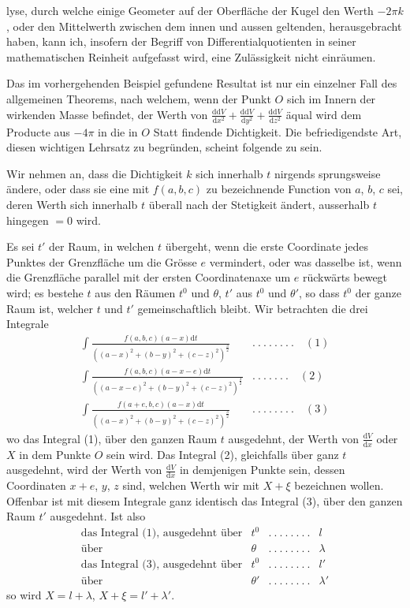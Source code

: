 lyse, durch welche einige Geometer auf der Oberfläche der Kugel den Werth $-2\pi k$, oder den Mittelwerth zwischen dem innen und aussen geltenden, herausgebracht haben, kann ich, insofern der Begriff von Differentialquotienten in seiner mathematischen Reinheit aufgefasst wird, eine Zulässigkeit nicht einräumen.

Das im vorhergehenden Beispiel gefundene Resultat ist nur ein einzelner Fall des allgemeinen Theorems, nach welchem, wenn der Punkt $O$ sich im Innern der wirkenden Masse befindet, der Werth von $\frac{\mathrm{d}\mathrm{d}V}{\mathrm{d}x^2}+\frac{\mathrm{d}\mathrm{d}V}{\mathrm{d}y^2}+\frac{\mathrm{d}\mathrm{d}V}{\mathrm{d}z^2}$ äqual wird dem Producte aus $-4\pi$ in die in $O$ Statt findende Dichtigkeit. Die befriedigendste Art, diesen wichtigen Lehrsatz zu begründen, scheint folgende zu sein.

Wir nehmen an, dass die Dichtigkeit $k$ sich innerhalb $t$ nirgends sprungs\-weise ändere, oder dass sie eine mit $f(a,b,c)$ zu bezeichnende Function von $a$, $b$, $c$ sei, deren Werth sich innerhalb $t$ überall nach der Stetigkeit ändert, ausserhalb $t$ hingegen $=0$ wird.

Es sei $t'$ der Raum, in welchen $t$ übergeht, wenn die erste Coordinate jedes Punktes der Grenzfläche um die Grösse $e$ vermindert, oder was dasselbe ist, wenn die Grenzfläche parallel mit der ersten Coordinatenaxe um $e$ rückwärts bewegt wird; es bestehe $t$ aus den Räumen $t^0$ und $\theta$, $t'$ aus $t^0$ und $\theta'$, so dass $t^0$ der ganze Raum ist, welcher $t$ und $t'$ gemeinschaftlich bleibt. Wir betrachten die drei Integrale
\[
\begin{array}{ll}
\displaystyle\int\frac{f(a,b,c)(a-x)\mathrm{d}t}{((a-x)^2+(b-y)^2+(c-z)^2)^{\frac{3}{2}}}&.\ .\ .\ .\ .\ .\ .\ .\quad(1)\\[8pt]
\displaystyle\int\frac{f(a,b,c)(a-x-e)\mathrm{d}t}{((a-x-e)^2+(b-y)^2+(c-z)^2)^{\frac{3}{2}}}&.\ .\ .\ .\ .\ .\ .\quad(2)\\[8pt]
\displaystyle\int\frac{f(a+e,b,c)(a-x)\mathrm{d}t}{((a-x)^2+(b-y)^2+(c-z)^2)^{\frac{3}{2}}}&.\ .\ .\ .\ .\ .\ .\ .\quad(3)
\end{array}
\]
wo das Integral (1), über den ganzen Raum $t$ ausgedehnt, der Werth von $\frac{\mathrm{d}V}{\mathrm{d}x}$ oder $X$ in dem Punkte $O$ sein wird. Das Integral (2), gleichfalls über ganz $t$ ausgedehnt, wird der Werth von $\frac{\mathrm{d}V}{\mathrm{d}x}$ in demjenigen Punkte sein, dessen Coordinaten $x+e$, $y$, $z$ sind, welchen Werth wir mit $X+\xi$ bezeichnen wollen. Offenbar ist mit diesem Integrale ganz identisch das Integral (3), über den ganzen Raum $t'$ ausgedehnt. Ist also
%
\[
\begin{array}{rlcl}
\text{das Integral (1), ausgedehnt über}&t^0&.\ .\ .\ .\ .\ .\ .\ .&l\\
\text{über}&\theta&.\ .\ .\ .\ .\ .\ .\ .&\lambda\\
\text{das Integral (3), ausgedehnt über}&t^0&.\ .\ .\ .\ .\ .\ .\ .&l'\\
\text{über}&\theta'&.\ .\ .\ .\ .\ .\ .\ .&\lambda'
\end{array}
\]
so wird $X=l+\lambda$, $X+\xi=l'+\lambda'$.

